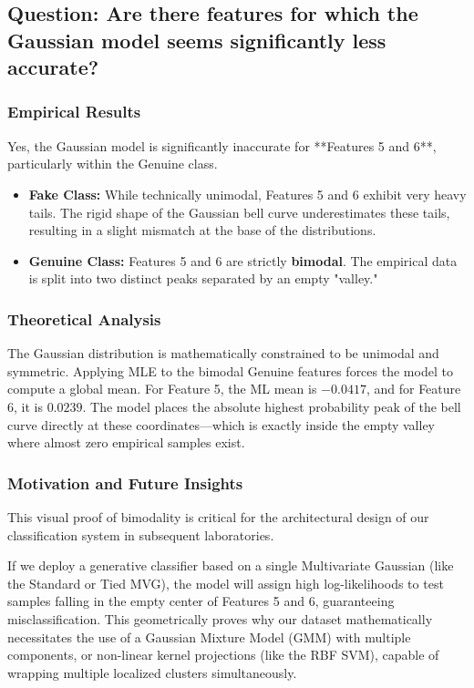 \documentclass[12pt, a4paper]{article}
\begin{document}
\subsection*{Question: Are there features for which the Gaussian model seems significantly less accurate?}

\subsubsection*{Empirical Results}
Yes, the Gaussian model is significantly inaccurate for **Features 5 and 6**, particularly within the Genuine class.

\begin{itemize}
    \item \textbf{Fake Class:} While technically unimodal, Features 5 and 6 exhibit very heavy tails. The rigid shape of the Gaussian bell curve underestimates these tails, resulting in a slight mismatch at the base of the distributions.
    \item \textbf{Genuine Class:} Features 5 and 6 are strictly \textbf{bimodal}. The empirical data is split into two distinct peaks separated by an empty "valley."
\end{itemize}

\subsubsection*{Theoretical Analysis}
The Gaussian distribution is mathematically constrained to be unimodal and symmetric. Applying MLE to the bimodal Genuine features forces the model to compute a global mean. For Feature 5, the ML mean is $-0.0417$, and for Feature 6, it is $0.0239$. The model places the absolute highest probability peak of the bell curve directly at these coordinates—which is exactly inside the empty valley where almost zero empirical samples exist. 

\subsubsection*{Motivation and Future Insights}
This visual proof of bimodality is critical for the architectural design of our classification system in subsequent laboratories. 

If we deploy a generative classifier based on a single Multivariate Gaussian (like the Standard or Tied MVG), the model will assign high log-likelihoods to test samples falling in the empty center of Features 5 and 6, guaranteeing misclassification. This geometrically proves why our dataset mathematically necessitates the use of a Gaussian Mixture Model (GMM) with multiple components, or non-linear kernel projections (like the RBF SVM), capable of wrapping multiple localized clusters simultaneously.
\end{document}

